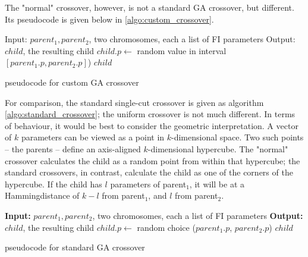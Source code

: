 \documentclass[times, utf8, diplomski]{fer}
\begin{document}
The "normal" crossover, however, is not a standard GA crossover, but different.
Its pseudocode is given below in \ref{algo:custom_crossover}.

\begin{algorithm}
    \small
    \begin{algorithmic}[1]
    \STATE Input: $parent_1, parent_2$, two chromosomes, each a list of FI parameters
    \STATE Output: $child$, the resulting child
        \STATE $child.p \gets $ random value in interval $[parent_1.p, parent_2.p]$)
    \ENDFOR
    \RETURN $child$
    \end{algorithmic}
    \caption{pseudocode for custom GA crossover}
    \label{algo:custom_crossover}
\end{algorithm}

For comparison, the standard single-cut crossover is given as algorithm \ref{algo:standard_crossover};
the uniform crossover is not much different.
In terms of behaviour, it would be best to consider the geometric interpretation.
A vector of $k$ parameters can be viewed as a point in $k$-dimensional space.
Two such points -- the parents -- define an axis-aligned $k$-dimensional hypercube.
The "normal" crossover calculates the child as a random point from within
that hypercube; the standard crossovers, in contrast, calculate the child as
one of the corners of the hypercube. If the child has $l$ parameters of parent$_1$,
it will be at a Hamming\footnotemark distance of $k-l$ from parent$_1$, and $l$
from parent$_2$.



\begin{algorithm}
    \small
    \begin{algorithmic}[1]
        \STATE \textbf{Input:} $parent_1, parent_2$, two chromosomes, each a list of FI parameters
        \STATE \textbf{Output:} $child$, the resulting child
            \STATE $child.p \gets $ random choice ($parent_1.p$, $parent_2.p$)
        \ENDFOR
        \RETURN $child$
    \end{algorithmic}
    \caption{pseudocode for standard GA crossover}
    \label{algo:standard_crossover}
\end{algorithm}
\end{document}
